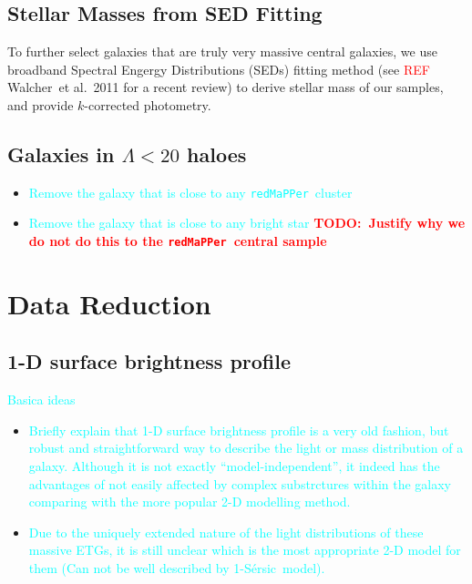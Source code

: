 \documentclass[preprint]{aastex}
\def\etal{{\ et al.~}}
\def\ser{{S\'{e}rsic\ }}
\def\redm{\texttt{redMaPPer}~}
\newcommand{\todo}[1]{\textcolor{red}{\textbf{TODO:~#1}}}
\newcommand{\plan}[1]{\textcolor{cyan}{#1}}
\newcommand{\addref}{{\textcolor{red}{REF}}}
\begin{document}
\begin{CJK*}{UTF8}{gbsn}
\subsection{Stellar Masses from SED Fitting}

    To further select galaxies that are truly very massive central galaxies, we use 
    broadband Spectral Engergy Distributions (SEDs) fitting method (see \addref 
    Walcher\etal 2011 for a recent review) to derive stellar mass
    of our samples, and provide $k$-corrected photometry.  


\subsection{Galaxies in $\Lambda < 20$ haloes}

    \begin{itemize}
        \item \plan{Remove the galaxy that is close to any \redm cluster}
        \item \plan{Remove the galaxy that is close to any bright star} 
            \todo{Justify why we do not do this to the \redm central sample}
    \end{itemize}
    

\section{Data Reduction}

\subsection{1-D surface brightness profile}

    \plan{Basica ideas}
    \begin{itemize}
        \item \plan{Briefly explain that 1-D surface brightness profile is a very old 
            fashion, but robust and straightforward way to describe the light or mass 
            distribution of a galaxy.  Although it is not exactly ``model-independent'', 
            it indeed has the advantages of not easily affected by complex substrctures 
            within the galaxy comparing with the more popular 2-D modelling method. }
        \item \plan{Due to the uniquely extended nature of the light distributions of 
            these massive ETGs, it is still unclear which is the most appropriate 2-D 
            model for them (Can not be well described by 1-\ser model). }
    \end{itemize}
    

\end{CJK*}
\end{document}
